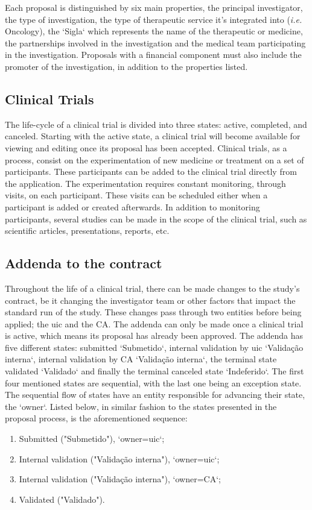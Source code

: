 Each proposal is distinguished by six main properties, the principal investigator, the type of investigation, the type of therapeutic service it's integrated into (\textit{i.e.} Oncology), the `Sigla` which represents the name of the therapeutic or medicine, the partnerships involved in the investigation and the medical team participating in the investigation.  
Proposals with a financial component must also include the promoter of the investigation, in addition to the properties listed.  

\subsection{Clinical Trials} 
\label{subsec:clinical-trials}
The life-cycle of a clinical trial is divided into three states: active, completed, and canceled.  
Starting with the active state, a clinical trial will become available for viewing and editing once its proposal has been accepted. 
Clinical trials, as a process, consist on the experimentation of new medicine or treatment on a set of participants. These participants can be added to the clinical trial directly from the application. The experimentation requires constant monitoring, through visits, on each participant. These visits can be scheduled either when a participant is added or created afterwards.  
In addition to monitoring participants, several studies can be made in the scope of the clinical trial, such as scientific articles, presentations, reports, etc. 

\subsection{Addenda to the contract}
\label{subsec:addenda-process}
Throughout the life of a clinical trial, there can be made changes to the study's contract, be it changing the investigator team or other factors that impact the standard run of the study. These changes pass through two entities before being applied; the \acrshort{uic} and the CA.  
The addenda can only be made once a clinical trial is active, which means its proposal has already been approved.  
The addenda has five different states: submitted `Submetido`, internal validation by \acrshort{uic} `Validação interna`, internal validation by CA `Validação interna`, the terminal state validated `Validado` and finally the terminal canceled state `Indeferido`.  
The first four mentioned states are sequential, with the last one being an exception state. The sequential flow of states have an entity responsible for advancing their state, the `owner`. Listed below, in similar fashion to the states presented in the proposal process, is the aforementioned sequence:
\begin{enumerate}
    \item Submitted ("Submetido"), `owner=\acrshort{uic}`;
    \item Internal validation ("Validação interna"), `owner=\acrshort{uic}`;
    \item Internal validation ("Validação interna"), `owner=CA`;
    \item Validated ("Validado").
\end{enumerate}


